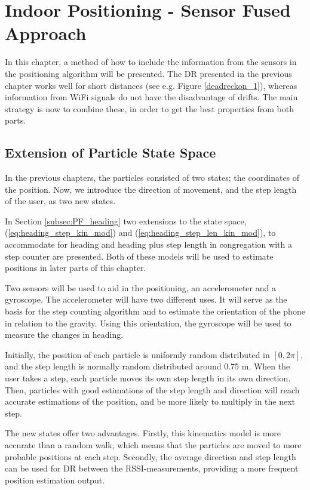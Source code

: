 \documentclass{LTHthesis}
\begin{document}
\chapter{Indoor Positioning - Sensor Fused Approach} 
\label{chap:sensor_fused}
%
In this chapter, a method of how to include the information from the sensors in the positioning algorithm will be presented. The DR presented in the previous chapter works well for short distances (see e.g. Figure \ref{deadreckon_1}), whereas information from WiFi signals do not have the disadvantage of drifts. The main strategy is now to combine these, in order to get the best properties from both  parts.



\section{Extension of Particle State Space}

In the previous chapters, the particles consisted of two states; the coordinates of the position. Now, we introduce the direction of movement, and the step length of the user, as two new states. 

In Section \ref{subsec:PF_heading} two extensions to the state space, (\ref{eq:heading_step_kin_mod}) and (\ref{eq:heading_step_len_kin_mod}), to accommodate for heading and heading plus step length in congregation with a step counter are presented. Both of these models will be used to estimate positions in later parts of this chapter.

Two sensors will be used to aid in the positioning, an accelerometer and a gyroscope. The accelerometer will have two different uses. It will serve as the basis for the step counting algorithm and to estimate the orientation of the phone in relation to the gravity. Using this orientation, the gyroscope will be used to measure the changes in heading.  

Initially, the position of each particle is uniformly random distributed in $[0,2\pi]$, and the step length is normally random distributed around 0.75 m. When the user takes a step, each particle moves its own step length in its own direction. Then, particles with good estimations of the step length and direction will reach accurate estimations of the position, and be more likely to multiply in the next step.

The new states offer two advantages. Firstly, this kinematics model is more accurate than a random walk, which means that the particles are moved to more probable positions at each step. Secondly, the average direction and step length can be used for DR between the RSSI-measurements, providing a more frequent position estimation output.
\end{document}

